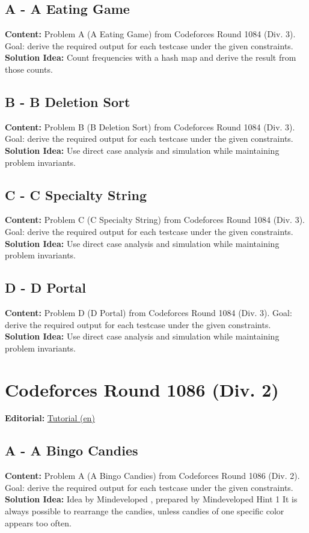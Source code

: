 \documentclass[11pt]{article}
\begin{document}
\subsection{A - A Eating Game}
\textbf{Content:} Problem A (A Eating Game) from Codeforces Round 1084 (Div. 3). Goal: derive the required output for each testcase under the given constraints.\\
\textbf{Solution Idea:} Count frequencies with a hash map and derive the result from those counts.

\subsection{B - B Deletion Sort}
\textbf{Content:} Problem B (B Deletion Sort) from Codeforces Round 1084 (Div. 3). Goal: derive the required output for each testcase under the given constraints.\\
\textbf{Solution Idea:} Use direct case analysis and simulation while maintaining problem invariants.

\subsection{C - C Specialty String}
\textbf{Content:} Problem C (C Specialty String) from Codeforces Round 1084 (Div. 3). Goal: derive the required output for each testcase under the given constraints.\\
\textbf{Solution Idea:} Use direct case analysis and simulation while maintaining problem invariants.

\subsection{D - D Portal}
\textbf{Content:} Problem D (D Portal) from Codeforces Round 1084 (Div. 3). Goal: derive the required output for each testcase under the given constraints.\\
\textbf{Solution Idea:} Use direct case analysis and simulation while maintaining problem invariants.

\section{Codeforces Round 1086 (Div. 2)}
\textbf{Editorial:} \href{https://codeforces.com/blog/entry/152073}{Tutorial (en)}

\subsection{A - A Bingo Candies}
\textbf{Content:} Problem A (A Bingo Candies) from Codeforces Round 1086 (Div. 2). Goal: derive the required output for each testcase under the given constraints.\\
\textbf{Solution Idea:} Idea by Mindeveloped , prepared by Mindeveloped Hint 1 It is always possible to rearrange the candies, unless candies of one specific color appears too often.
\end{document}
